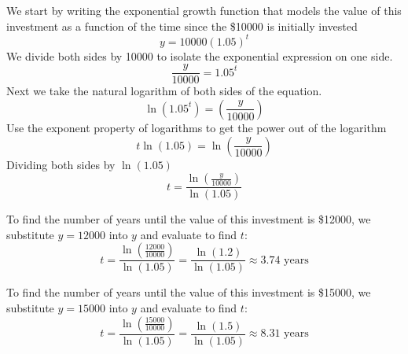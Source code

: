 \begin{solution}
    We start by writing the exponential growth function that models the value of this investment as a function of the time since the \$10000 is initially invested
    \[ y = 10000(1.05)^t \]
    We divide both sides by 10000 to isolate the exponential expression on one side.
    \[ \frac{y}{10000} = 1.05^t \]
    Next we take the natural logarithm of both sides of the equation.
    \[ \ln(1.05^t) =\left( \frac{y}{10000} \right) \]
    Use the exponent property of logarithms to get the power out of the logarithm
    \[ t \ln(1.05)= \ln\left( \frac{y}{10000} \right) \]
    Dividing both sides by \( \ln(1.05) \)
    \[ t = \frac{\ln\left( \frac{y}{10000} \right)}{\ln(1.05)} \]

    To find the number of years until the value of this investment is \$12000, we substitute \( y = 12000 \) into \( y \) and evaluate to find \( t \):
    \[ t  = \frac{\ln\left( \frac{12000}{10000} \right)}{\ln(1.05)} = \frac{\ln(1.2)}{\ln(1.05)} \approx 3.74 \text{ years} \]

    To find the number of years until the value of this investment is \$15000, we substitute \( y = 15000 \) into \( y \) and evaluate to find \( t \):
    \[ t = \frac{\ln\left( \frac{15000}{10000} \right)}{\ln(1.05)} = \frac{\ln(1.5)}{\ln(1.05)} \approx 8.31 \text{ years} \]
\end{solution}